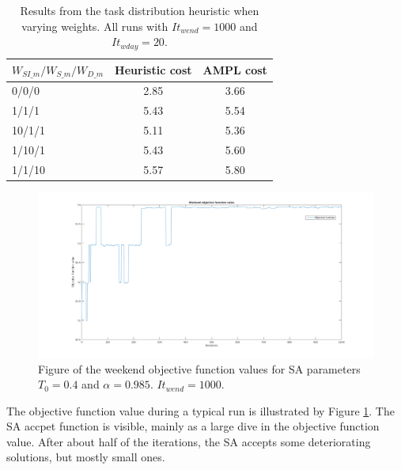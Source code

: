 \begin{table}[!h]
\centering
\label{tab:taskdist_weights_res}
\caption{Results from the task distribution heuristic when varying weights. All runs with $It_{wend} = 1000$ and $It_{wday} = 20$.}
\begin{tabular}{|l|l|l|}
\hline
\rowcolor{Gray} \textbf{$W_{SI\_m}/W_{S\_m}/W_{D\_m}$} & \textbf{Heuristic cost} &  \textbf{AMPL cost} \\ \hline
\cellcolor{Gray} 0/0/0 & \multicolumn{1}{c|}{2.85} & \multicolumn{1}{c|}{3.66}  \\
\cellcolor{Gray} 1/1/1 & \multicolumn{1}{c|}{5.43} & \multicolumn{1}{c|}{5.54}  \\
\cellcolor{Gray} 10/1/1 & \multicolumn{1}{c|}{5.11} & \multicolumn{1}{c|}{5.36}  \\
\cellcolor{Gray} 1/10/1 & \multicolumn{1}{c|}{5.43} & \multicolumn{1}{c|}{5.60}  \\
\cellcolor{Gray} 1/1/10 & \multicolumn{1}{c|}{5.57} & \multicolumn{1}{c|}{5.80} \\
\hline
\end{tabular}
\end{table}


\begin{figure}[!h]
\centering
\includegraphics[width=\textwidth, trim = 100px 50px 100px 20px, clip]{Chapters/ImagesEmelie/Plot_1000_20.png}
\caption{Figure of the weekend objective function values for SA parameters $T_0 = 0.4$ and $\alpha = 0.985$. $It_{wend} = 1000$.}
\label{fig:obj_fun_vals}
\end{figure}

The objective function value during a typical run is illustrated by Figure \ref{fig:obj_fun_vals}. The SA accpet function is visible, mainly as a large dive in the objective function value. After about half of the iterations, the SA accepts some deteriorating solutions, but mostly small ones.

